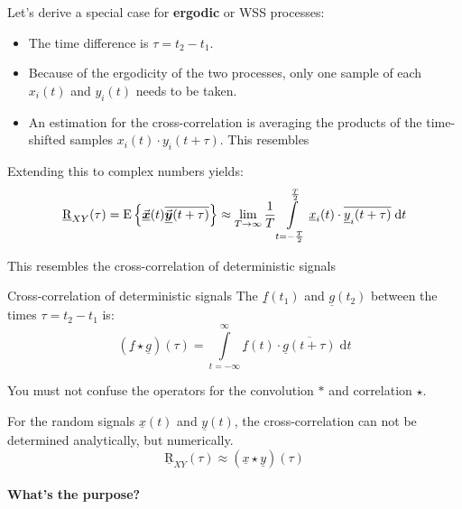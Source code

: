 \begin{refsection}
Let's derive a special case for \textbf{ergodic} or \ac{WSS} processes:
\begin{itemize}
	\item The time difference is $\tau = t_2 - t_1$.
	\item Because of the ergodicity of the two processes, only one sample of each $x_i(t)$ and $y_i(t)$ needs to be taken.
	\item An estimation for the cross-correlation is averaging the products of the time-shifted samples $x_i(t) \cdot y_i(t+\tau)$. This resembles
\end{itemize}
Extending this to complex numbers yields:
\begin{equation}
	\underline{\mathrm{R}}_{XY}(\tau) = \mathrm{E}\left\{ \vec{\bm{\underline{x}}}(t) \overline{\vec{\bm{\underline{y}}}(t+\tau)} \right\} \approx \lim\limits_{T \rightarrow \infty} \frac{1}{T} \int\limits_{t = -\frac{T}{2}}^{\frac{T}{2}} \underline{x}_i(t) \cdot \overline{\underline{y}_i(t+\tau)} \; \mathrm{d} t
\end{equation}

This resembles the cross-correlation of deterministic signals
\begin{definition}{Cross-correlation of deterministic signals}
	The   $\underline{f}(t_1)$ and $\underline{g}(t_2)$ between the times $\tau = t_2 - t_1$ is:
	\begin{equation}
		\left(\underline{f} \star \underline{g}\right)(\tau) = \int\limits_{t = -\infty}^{\infty} \underline{f}(t) \cdot \overline{\underline{g}(t+\tau)} \; \mathrm{d} t
	\end{equation}%
\end{definition}

\begin{attention}
	You must not confuse the operators for the convolution $*$ and correlation $\star$.
\end{attention}

For the random signals $\underline{x}(t)$ and $\underline{y}(t)$, the cross-correlation can not be determined analytically, but numerically.
\begin{equation}
	\underline{\mathrm{R}}_{XY}(\tau) \approx \left(\underline{x} \star \underline{y}\right)(\tau)
\end{equation}

\paragraph{What's the purpose?}


\end{refsection}
